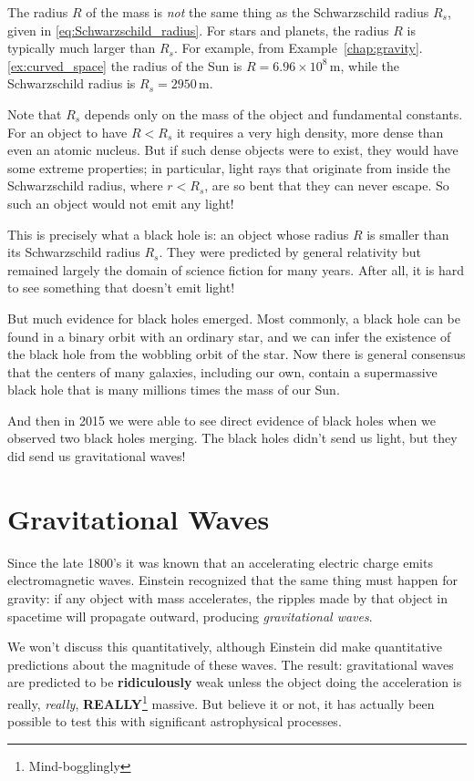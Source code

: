 The radius $R$ of the mass is \textit{not} the same thing as the
Schwarzschild radius $R_s$, given in
\eqref{eq:Schwarzschild_radius}.  For stars and
planets, the radius $R$ is typically much larger than $R_s$.  For
example, from Example~\ref{chap:gravity}.\ref{ex:curved_space} the
radius of the Sun is $R=6.96\times 10^8\,\text{m}$, while the
Schwarzschild radius is $R_s=2950\,\text{m}$.

Note that $R_s$ depends only on the mass of the object and fundamental
constants.  For an object to have $R<R_s$ it requires a very high
density, more dense than even an atomic nucleus.  But if such dense
objects were to exist, they would have some extreme properties; in
particular, light rays that originate from inside the Schwarzschild
radius, where $r<R_s$, are so bent that they can never escape.  So
such an object would not emit any light!

This is precisely what a black hole is: an object whose radius $R$ is
smaller than its Schwarzschild radius $R_s$. They were predicted by
general relativity but remained largely the domain of science fiction
for many years.  After all, it is hard to see something that doesn't
emit light!

But much evidence for black holes emerged.  Most commonly, a black hole
can be found in a binary orbit with an ordinary star, and we can infer
the existence of the black hole from the wobbling orbit of the star.
Now there is general consensus that the centers of many galaxies, including
our own, contain a supermassive black hole that is many millions times the
mass of our Sun.

And then in 2015 we were able to see direct evidence of black holes when
we observed two black holes merging.   The black holes didn't send us
light, but they did send us gravitational waves!

\section{Gravitational Waves}

Since the late 1800's it was known that an accelerating electric
charge emits electromagnetic waves.  Einstein recognized that the same
thing must happen for gravity: if any object with mass accelerates,
the ripples made by that object in spacetime will propagate outward,
producing \emph{gravitational waves}.

We won't discuss this quantitatively, although Einstein did make
quantitative predictions about the magnitude of these waves. The
result: gravitational waves are predicted to be \textbf{ridiculously}
weak unless the object doing the acceleration is really, \emph{really},
\textbf{REALLY}\footnote{Mind-bogglingly} massive. But believe it or not,
it has actually been possible to test this with significant
astrophysical processes.

